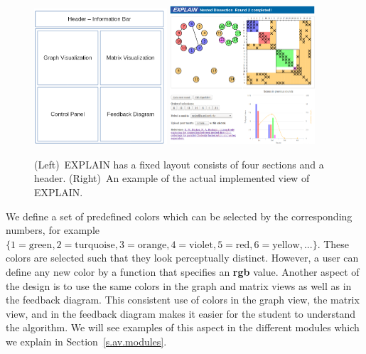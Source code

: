 \documentclass[12pt, twoside,a4paper,toc=bibliography]{scrbook}
\newcommand{\secref}[1]{Section~\protect\ref{#1}}
\begin{document}
\begin{figure}
\centering
\includegraphics[width=0.44\textwidth]{explain-vis.png}
\hfill
\includegraphics[width=0.48\textwidth]{explain2-init.png}
\caption{
(Left)~\mbox{EXPLAIN} has a fixed layout consists of four sections and a header.
(Right)~An example of the actual implemented view of \mbox{EXPLAIN}.}
\label{explain-design}
\end{figure}

We define a set of predefined colors which can be selected by
the corresponding numbers, for example
$\{1=\text{green}, 2=\text{turquoise}, 3=\text{orange}, 4=\text{violet},
5=\text{red}, 6=\text{yellow}, ...\}$.
These colors are selected such that they look perceptually distinct.
However, a user can define any new color by a function that specifies an \textbf{rgb} value.
Another aspect of the design is to use the same colors in the graph and matrix views
as well as in the feedback diagram.
This consistent use of colors in the graph
view, the matrix view, and in the feedback diagram makes it easier for the student to understand
the algorithm. We will see examples of this aspect in the different modules
which we explain in \secref{s.av.modules}.
\end{document}
